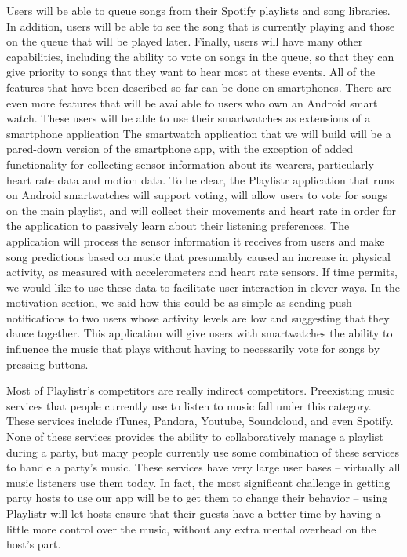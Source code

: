 \documentclass[12pt]{article}
\begin{document}
Users will be able to queue songs from their Spotify playlists and
song libraries. In addition, users will be able to see the song that
is currently playing and those on the queue that will be played
later. Finally, users will have many other capabilities, including the
ability to vote on songs in the queue, so that they can give priority
to songs that they want to hear most at these events. All of the
features that have been described so far can be done on
smartphones. There are even more features that will be available to
users who own an Android smart watch. These users will be able to use
their smartwatches as extensions of a smartphone application The
smartwatch application that we will build will be a pared-down version
of the smartphone app, with the exception of added functionality for
collecting sensor information about its wearers, particularly heart
rate data and motion data. To be clear, the Playlistr application that
runs on Android smartwatches will support voting, will allow users to
vote for songs on the main playlist, and will collect their movements
and heart rate in order for the application to passively learn about
their listening preferences. The application will process the sensor
information it receives from users and make song predictions based on
music that presumably caused an increase in physical activity, as
measured with accelerometers and heart rate sensors. If time permits,
we would like to use these data to facilitate user interaction in
clever ways. In the motivation section, we said how this could be as
simple as sending push notifications to two users whose activity
levels are low and suggesting that they dance together. This
application will give users with smartwatches the ability to influence
the music that plays without having to necessarily vote for songs by
pressing buttons.

Most of Playlistr’s competitors are really indirect
competitors. Preexisting music services that people currently use to
listen to music fall under this category. These services include
iTunes, Pandora, Youtube, Soundcloud, and even Spotify. None of these
services provides the ability to collaboratively manage a playlist
during a party, but many people currently use some combination of
these services to handle a party’s music. These services have very
large user bases – virtually all music listeners use them today. In
fact, the most significant challenge in getting party hosts to use our
app will be to get them to change their behavior – using Playlistr
will let hosts ensure that their guests have a better time by having a
little more control over the music, without any extra mental overhead
on the host’s part.
\end{document}
